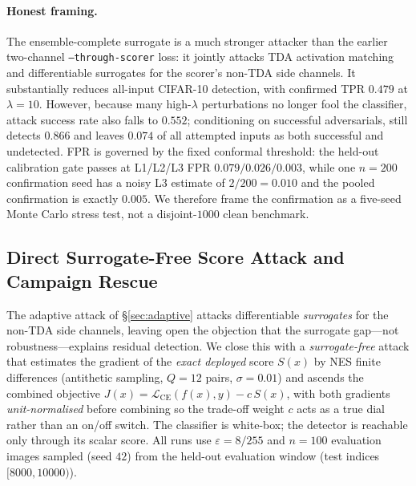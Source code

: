\paragraph{Honest framing.} The ensemble-complete surrogate is a much
stronger attacker than the earlier two-channel \texttt{--through-scorer}
loss: it jointly attacks TDA activation matching and differentiable
surrogates for the scorer's non-TDA side channels. It substantially
reduces all-input CIFAR-10 detection, with confirmed TPR
$0.479$ at $\lambda{=}10$. However, because many high-$\lambda$
perturbations no longer fool the classifier, attack success rate also
falls to $0.552$; conditioning on successful adversarials, \prism still
detects $0.866$ and leaves $0.074$ of all attempted inputs as both
successful and undetected. FPR is governed by the fixed conformal
threshold: the held-out calibration gate passes at L1/L2/L3 FPR
$0.079/0.026/0.003$, while one $n{=}200$ confirmation seed has a noisy
L3 estimate of $2/200=0.010$ and the pooled confirmation is exactly
$0.005$. We therefore frame the confirmation as a five-seed Monte Carlo
stress test, not a disjoint-$1000$ clean benchmark.

\subsection{Direct Surrogate-Free Score Attack and Campaign Rescue}
\label{sec:direct_score}

The adaptive attack of \S\ref{sec:adaptive} attacks differentiable
\emph{surrogates} for the non-TDA side channels, leaving open the objection
that the surrogate gap---not robustness---explains residual detection. We
close this with a \emph{surrogate-free} attack that estimates the gradient of
the \emph{exact deployed} score $S(x)$ by NES finite differences (antithetic
sampling, $Q{=}12$ pairs, $\sigma{=}0.01$) and ascends the combined objective
$J(x) = \mathcal{L}_\text{CE}(f(x),y) - c\,S(x)$, with both gradients
\emph{unit-normalised} before combining so the trade-off weight $c$ acts as a
true dial rather than an on/off switch. The classifier is white-box; the
detector is reachable only through its scalar score. All runs use
$\varepsilon{=}8/255$ and $n{=}100$ evaluation images sampled (seed $42$)
from the held-out evaluation window (test indices $[8000,10000)$).

